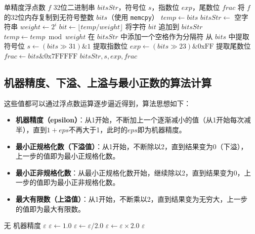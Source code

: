 \documentclass{article}
\begin{document}
\begin{algorithm}[H]
\caption{用取模法提取单精度浮点数的二进制表示}
\begin{algorithmic}[1]
\REQUIRE 单精度浮点数 $f$
\ENSURE 32位二进制串 $bitsStr$，符号位 $s$，指数位 $exp$，尾数位 $frac$
\STATE 将 $f$ 的32位内存复制到无符号整数 $bits$（使用 \texttt{memcpy}）
\STATE $temp \gets bits$
\STATE $bitsStr \gets$ 空字符串
    \STATE $weight \gets 2^i$  
    \STATE $bit \gets \lfloor temp / weight \rfloor$
    \STATE 将字符 $bit$ 追加到 $bitsStr$
    \STATE $temp \gets temp \bmod weight$
        \STATE 在 $bitsStr$ 中添加一个空格作为分隔符
    \ENDIF
\ENDFOR
\STATE 从 $bits$ 中提取符号位 $s \gets (bits \gg 31) \& 1$
\STATE 提取指数位 $exp \gets (bits \gg 23) \& 0\text{xFF}$
\STATE 提取尾数位 $frac \gets bits \& 0\text{x7FFFFF}$
\RETURN $bitsStr, s, exp, frac$
\end{algorithmic}
\end{algorithm}

\subsection{机器精度、下溢、上溢与最小正数的算法计算}
这些值都可以通过浮点数运算逐步逼近得到，算法思想如下：
\begin{itemize}
    \item \textbf{机器精度（epsilon）}：从1开始，不断加上一个逐渐减小的值（从1开始每次减半），直到\(1+eps\)不再大于1，此时的\(eps\)即为机器精度。
    \item \textbf{最小正规格化数（下溢值）}：从1开始，不断除以2，直到结果变为0（下溢），上一步的值即为最小正规格化数。
    \item \textbf{最小正非规格化数}：从最小正规格化数开始，继续除以2，直到结果变为0，上一步的值即为最小正非规格化数。
    \item \textbf{最大有限数（上溢值）}：从1开始，不断乘以2，直到结果变为无穷大，上一步的值即为最大有限数。
\end{itemize}

\begin{algorithm}[H]
\caption{计算机器精度}
\begin{algorithmic}[1]
\REQUIRE 无
\ENSURE 机器精度 $\varepsilon$
\STATE $\varepsilon \gets 1.0$
    \STATE $\varepsilon \gets \varepsilon / 2.0$
\ENDWHILE
\STATE $\varepsilon \gets \varepsilon \times 2.0$ 
\RETURN $\varepsilon$
\end{algorithmic}
\end{algorithm}
\end{document}
